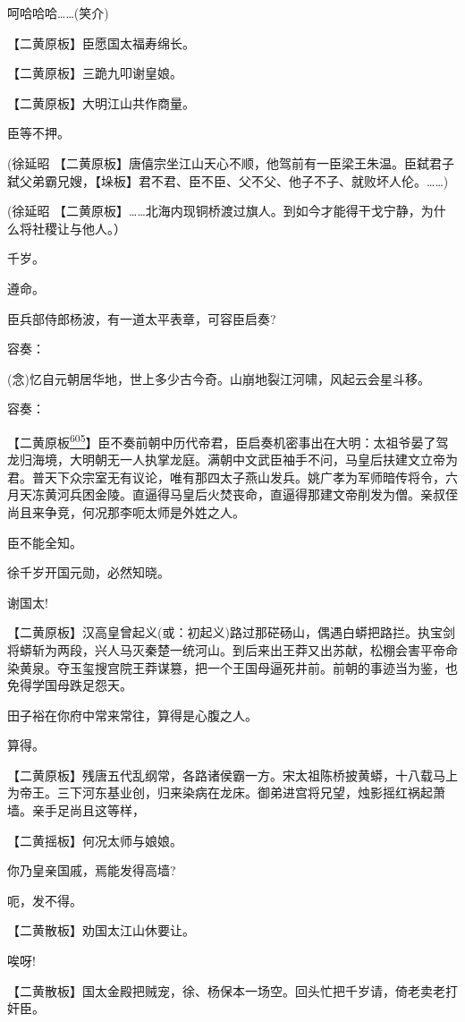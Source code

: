 呵哈哈哈\ldots{}\ldots{}(笑介)

【二黄原板】臣愿国太福寿绵长。

【二黄原板】三跪九叩谢皇娘。

【二黄原板】大明江山共作商量。

臣等不押。

(徐延昭
【二黄原板】唐僖宗坐江山天心不顺，他驾前有一臣梁王朱温。臣弑君子弑父弟霸兄嫂，【垛板】君不君、臣不臣、父不父、他子不子、就败坏人伦。\ldots{}\ldots{})

(徐延昭
【二黄原板】\ldots{}\ldots{}北海内现铜桥渡过旗人。到如今才能得干戈宁静，为什么将社稷让与他人。）

千岁。

遵命。

臣兵部侍郎杨波，有一道太平表章，可容臣启奏?

容奏：

(念)忆自元朝居华地，世上多少古今奇。山崩地裂江河啸，风起云会星斗移。

容奏：

【二黄原板\protect\hyperlink{fn605}{\textsuperscript{605}}】臣不奏前朝中历代帝君，臣启奏机密事出在大明：太祖爷晏了驾龙归海境，大明朝无一人执掌龙庭。满朝中文武臣袖手不问，马皇后扶建文立帝为君。普天下众宗室无有议论，唯有那四太子燕山发兵。姚广孝为军师暗传将令，六月天冻黄河兵困金陵。直逼得马皇后火焚丧命，直逼得那建文帝削发为僧。亲叔侄尚且来争竞，何况那李呃太师是外姓之人。

臣不能全知。

徐千岁开国元勋，必然知晓。

谢国太!

【二黄原板】汉高皇曾起义(或：初起义)路过那硭砀山，偶遇白蟒把路拦。执宝剑将蟒斩为两段，兴人马灭秦楚一统河山。到后来出王莽又出苏献，松棚会害平帝命染黄泉。夺玉玺搜宫院王莽谋篡，把一个王国母逼死井前。前朝的事迹当为鉴，也免得学国母跌足怨天。

田子裕在你府中常来常往，算得是心腹之人。

算得。

【二黄原板】残唐五代乱纲常，各路诸侯霸一方。宋太祖陈桥披黄蟒，十八载马上为帝王。三下河东基业创，归来染病在龙床。御弟进宫将兄望，烛影摇红祸起萧墙。亲手足尚且这等样，

【二黄摇板】何况太师与娘娘。

你乃皇亲国戚，焉能发得高墙?

呃，发不得。

【二黄散板】劝国太江山休要让。

唉呀!

【二黄散板】国太金殿把贼宠，徐、杨保本一场空。回头忙把千岁请，倚老卖老打奸臣。


